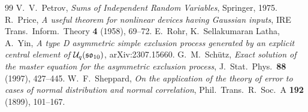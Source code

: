 \documentclass[11pt]{article}
\theoremstyle{plain}
\theoremstyle{definition}
\theoremstyle{remark}
\begin{document}
\begin{thebibliography}{99}
 V.~V.~Petrov, \emph{Sums of Independent Random Variables}, Springer, 1975.
 R.~Price, \emph{A useful theorem for nonlinear devices having Gaussian
inputs}, IRE Trans.~Inform.~Theory \textbf{4} (1958), 69--72.
 E.~Rohr, K.~Sellakumaran Latha, A.~Yin, \emph{A type D asymmetric simple
exclusion process generated by an explicit central element of
$\mathcal U_q(\mathfrak{so}_{10})$}, arXiv:2307.15660.
 G.~M.~Sch\"utz, \emph{Exact solution of the master equation for the
asymmetric exclusion process}, J.~Stat.~Phys.~\textbf{88} (1997), 427--445.
 W.~F.~Sheppard, \emph{On the application of the theory of error to cases
of normal distribution and normal correlation}, Phil.~Trans.~R.~Soc.~A \textbf{192}
(1899), 101--167.
\end{thebibliography}
\end{document}
